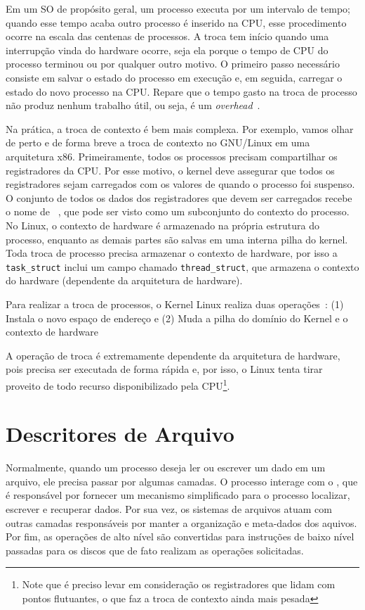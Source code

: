 Em um SO de propósito geral, um processo executa por um intervalo de tempo;
quando esse tempo acaba outro processo é inserido na CPU, esse procedimento
ocorre na escala das centenas de processos. A troca tem início quando uma
interrupção vinda do hardware ocorre, seja ela porque o tempo de CPU do
processo terminou ou por qualquer outro motivo. O primeiro passo necessário
consiste em salvar o estado do processo em execução e, em seguida, carregar o
estado do novo processo na CPU. Repare que o tempo gasto na troca de processo
não produz nenhum trabalho útil, ou seja, é um
\textit{overhead}~\citep{silberschatz}.

Na prática, a troca de contexto é bem mais complexa. Por exemplo, vamos olhar
de perto e de forma breve a troca de contexto no GNU/Linux em uma arquitetura
x86.  Primeiramente, todos os processos precisam compartilhar os registradores
da CPU. Por esse motivo, o kernel deve assegurar que todos os registradores
sejam carregados com os valores de quando o processo foi suspenso. O conjunto
de todos os dados dos registradores que devem ser carregados recebe o nome de
~\citep{entendendo_kernel}, que pode ser
visto como um subconjunto do contexto do processo. No Linux, o contexto de
hardware é armazenado na própria estrutura do processo, enquanto as demais
partes são salvas em uma interna pilha do kernel. Toda troca de processo
precisa armazenar o contexto de hardware, por isso a \texttt{task\_struct}
inclui um campo chamado \texttt{thread\_struct}, que armazena o contexto do
hardware (dependente da arquitetura de hardware).

Para realizar a troca de processos, o Kernel Linux realiza duas
operações~\citep{entendendo_kernel}: (1) Instala o novo espaço de endereço e
(2) Muda a pilha do domínio do Kernel e o contexto de hardware

A operação de troca é extremamente dependente da arquitetura de hardware, pois
precisa ser executada de forma rápida e, por isso, o Linux tenta tirar proveito
de todo recurso disponibilizado pela CPU\footnote{Note que é preciso levar em
consideração os registradores que lidam com pontos flutuantes, o que faz a troca
de contexto ainda mais pesada}.

\section{Descritores de Arquivo}

Normalmente, quando um processo deseja ler ou escrever um dado em um arquivo,
ele precisa passar por algumas camadas. O processo interage com o
, que é responsável por fornecer um mecanismo
simplificado para o processo localizar, escrever e recuperar dados. Por sua
vez, os sistemas de arquivos atuam com outras camadas responsáveis por manter a
organização e meta-dados dos aquivos. Por fim, as operações de alto nível são
convertidas para instruções de baixo nível passadas para os discos que de fato
realizam as operações solicitadas.

